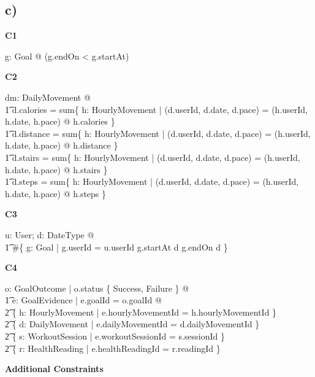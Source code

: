 \documentclass{article}
\begin{document}
\subsection*{\small c)}
\textbf{\small{C1}}
\begin{zed}
\forall g: Goal @ \lnot (g.endOn < g.startAt) \\
\end{zed}
\textbf{\small{C2}}
\begin{zed}
\forall dm: DailyMovement @ \\
    \t1 d.calories = sum\{ h: HourlyMovement | (d.userId, d.date, d.pace) = (h.userId, h.date, h.pace) @ h.calories \} \\
    \t1 d.distance = sum\{ h: HourlyMovement | (d.userId, d.date, d.pace) = (h.userId, h.date, h.pace) @ h.distance \} \\
    \t1 d.stairs = sum\{ h: HourlyMovement | (d.userId, d.date, d.pace) = (h.userId, h.date, h.pace) @ h.stairs \} \\
    \t1 d.steps = sum\{ h: HourlyMovement | (d.userId, d.date, d.pace) = (h.userId, h.date, h.pace) @ h.steps \} \\
\end{zed}
\textbf{\small{C3}}
\begin{zed}
\forall u: User; d: DateType @ \\
\t1 \#\{ g: Goal | g.userId = u.userId \land g.startAt \leq d \land g.endOn \geq d \} 
\end{zed}
\textbf{\small{C4}}
\begin{zed}
\forall o: GoalOutcome | o.status \in \{ Success, Failure \} @ \\
\t1 \exists e: GoalEvidence | e.goalId = o.goalId @ \\
\t2 \{ h: HourlyMovement | e.hourlyMovementId = h.hourlyMovementId \} \neq \emptyset \lor \\
\t2 \{ d: DailyMovement | e.dailyMovementId = d.dailyMovementId \} \neq \emptyset \lor \\
\t2 \{ s: WorkoutSession | e.workoutSessionId = s.sessionId \} \neq \emptyset \\
\t2 \{ r: HealthReading | e.healthReadingId = r.readingId \} \neq \emptyset \lor \\
\end{zed}
\textbf{\small{Additional Constraints}}
\end{document}
